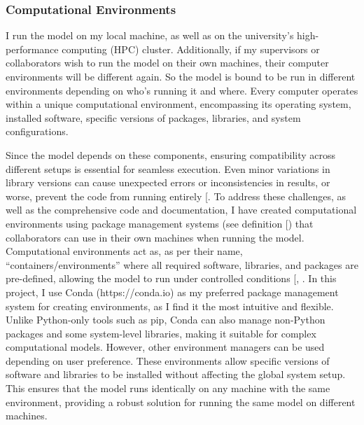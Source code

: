 \documentclass[
  11pt,
  letterpaper,
]{scrreprt}
\begin{document}
\subsubsection*{Computational
Environments}\label{computational-environments}

I run the model on my local machine, as well as on the university's
high-performance computing (HPC) cluster. Additionally, if my
supervisors or collaborators wish to run the model on their own
machines, their computer environments will be different again. So the
model is bound to be run in different environments depending on who's
running it and where. Every computer operates within a unique
computational environment, encompassing its operating system, installed
software, specific versions of packages, libraries, and system
configurations.

Since the model depends on these components, ensuring compatibility
across different setups is essential for seamless execution. Even minor
variations in library versions can cause unexpected errors or
inconsistencies in results, or worse, prevent the code from running
entirely {[}\citeproc{ref-spinellis2003Code}{384}{]}. To address these
challenges, as well as the comprehensive code and documentation, I have
created computational environments using package management systems (see
definition
{[}\citeproc{ref-turingwaycommunity2019TuringWayHandbook}{357}{]}) that
collaborators can use in their own machines when running the model.
Computational environments act as, as per their name,
``containers/environments'' where all required software, libraries, and
packages are pre-defined, allowing the model to run under controlled
conditions {[},
\citeproc{ref-maji2020Demystifying}{386}{]}. In this project, I use
Conda (https://conda.io) as my preferred package management system for
creating environments, as I find it the most intuitive and flexible.
Unlike Python-only tools such as pip, Conda can also manage non-Python
packages and some system-level libraries, making it suitable for complex
computational models. However, other environment managers can be used
depending on user preference. These environments allow specific versions
of software and libraries to be installed without affecting the global
system setup. This ensures that the model runs identically on any
machine with the same environment, providing a robust solution for
running the same model on different machines.
\end{document}
